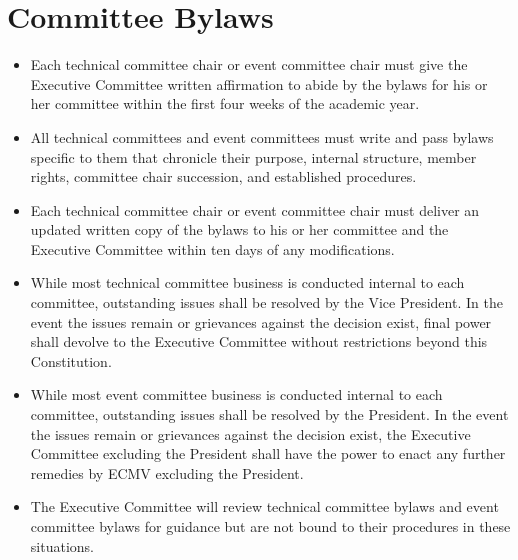 \documentclass[12pt]{constitution}
\begin{document}
\section{Committee Bylaws}
\label{sec:amend_techbylaw}
\begin{itemize}
    \item Each technical committee chair or event committee chair must give the Executive Committee written affirmation to abide by the bylaws for his or her committee within the first four weeks of the academic year.
    \item All technical committees and event committees must write and pass bylaws specific to them that chronicle their purpose, internal structure, member rights, committee chair succession, and established procedures.
    \item Each technical committee chair or event committee chair must deliver an updated written copy of the bylaws to his or her committee and the Executive Committee within ten days of any modifications.
    \item While most technical committee business is conducted internal to each committee, outstanding issues shall be resolved by the Vice President. In the event the issues remain or grievances against the decision exist, final power shall devolve to the Executive Committee without restrictions beyond this Constitution.
    \item While most event committee business is conducted internal to each committee, outstanding issues shall be resolved by the President. In the event the issues remain or grievances against the decision exist, the Executive Committee excluding the President shall have the power to enact any further remedies by ECMV excluding the President.
    \item The Executive Committee will review technical committee bylaws and event committee bylaws for guidance but are not bound to their procedures in these situations.
\end{itemize}


\label{art:dues}
\end{document}
